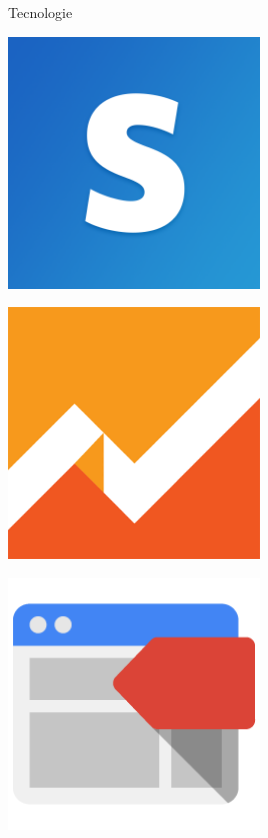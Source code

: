 \begin{frame}{Tecnologie}
\begin{minipage}{\textwidth}
\begin{minipage}{0.49\textwidth}
\begin{itemize}
					\end{itemize}
				\end{minipage}
				\begin{minipage}{0.49\textwidth}
					\begin{minipage}{0.48\textwidth}
						\begin{flushright}
							\includegraphics[width=0.5\textwidth]{capitolo_2/immagini/stripe.png}
						\end{flushright}
					\end{minipage}
					\begin{minipage}{0.48\textwidth}
						\includegraphics[width=0.5\textwidth]{capitolo_2/immagini/google_analytics.png}
					\end{minipage}\par
					\vspace{0.02\textwidth}
					\begin{minipage}{0.48\textwidth}
						\begin{flushright}
							\includegraphics[width=0.5\textwidth]{capitolo_2/immagini/google_tag_manager.png}

\end{flushright}
\end{minipage}
\end{minipage}
\end{minipage}
\end{frame}
